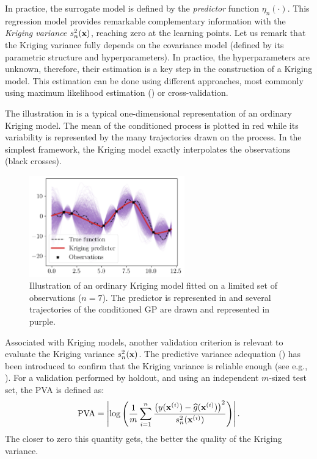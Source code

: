 In practice, the surrogate model is defined by the \textit{predictor} function $\eta_n(\cdot)$. 
This regression model provides remarkable complementary information with the \textit{Kriging variance} $s_n^2({\bf x})$, reaching zero at the learning points. 
Let us remark that the Kriging variance fully depends on the covariance model (defined by its parametric structure and hyperparameters). 
In practice, the hyperparameters are unknown, therefore, their estimation is a key step in the construction of a Kriging model. 
This estimation can be done using different approaches, most commonly using maximum likelihood estimation () or cross-validation.

The illustration in  is a typical one-dimensional representation of an ordinary Kriging model. 
The mean of the conditioned process is plotted in red while its variability is represented by the many trajectories drawn on the process. 
In the simplest framework, the Kriging model exactly interpolates the observations (black crosses). 

\begin{figure}[ht]
    \centering
    \includegraphics[width=0.6\textwidth]{../numerical_experiments/chapter1/figures/kriging_1D.png}
    \caption{Illustration of an ordinary Kriging model fitted on a limited set of observations ($n=7$). 
    The predictor is represented in and several trajectories of the conditioned GP are drawn and represented in purple.}
    \label{fig:kriging_1D}
\end{figure}


Associated with Kriging models, another validation criterion is relevant to evaluate the Kriging variance $s_n^2({\bf x})$. 
The predictive variance adequation () has been introduced to confirm that the Kriging variance is reliable enough (see e.g., \citealp{bachoc_2013,demay_2022}). 
For a validation performed by holdout, and using an independent $m$-sized test set, the PVA is defined as: 
\begin{equation}
    \mathrm{PVA} = \left| \log\left( \frac1m \sum_{i=1}^{n} \frac{\left(y({\bf x}^{(i)}) - \widehat{g}({\bf x}^{(i)})\right)^2}{s_n^2({\bf x}^{(i)})}\right) \right|.
\end{equation}
The closer to zero this quantity gets, the better the quality of the Kriging variance. 

